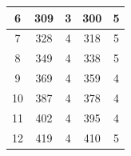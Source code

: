 \begin{table}[]
\begin{tabular}{|c|c|c|c|c|}
6                                                                    & 309                                                                                       & 3                                 & 300                                                                                          & 5                                  \\ \hline
7                                                                    & 328                                                                                       & 4                                 & 318                                                                                          & 5                                  \\ \hline
8                                                                    & 349                                                                                       & 4                                 & 338                                                                                          & 5                                  \\ \hline
9                                                                    & 369                                                                                       & 4                                 & 359                                                                                          & 4                                  \\ \hline
10                                                                   & 387                                                                                       & 4                                 & 378                                                                                          & 4                                  \\ \hline
11                                                                   & 402                                                                                       & 4                                 & 395                                                                                          & 4                                  \\ \hline
12                                                                   & 419                                                                                       & 4                                 & 410                                                                                          & 5                                  \\ \hline

\end{tabular}
\end{table}
